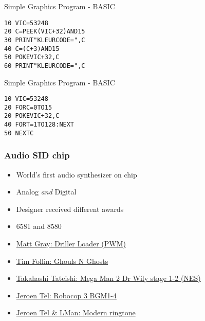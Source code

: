 \documentclass{beamer}
\begin{document}

\begin{frame}[fragile]{Simple Graphics Program - BASIC}

\begin{lstlisting}
10 VIC=53248
20 C=PEEK(VIC+32)AND15
30 PRINT"KLEURCODE=",C
40 C=(C+3)AND15
50 POKEVIC+32,C
60 PRINT"KLEURCODE=",C
\end{lstlisting}

\end{frame}


\begin{frame}[fragile]{Simple Graphics Program - BASIC}

\begin{lstlisting}
10 VIC=53248
20 FORC=0TO15
20 POKEVIC+32,C
40 FORT=1TO128:NEXT
50 NEXTC
\end{lstlisting}

\end{frame}



\begin{frame}
\frametitle{Audio SID chip}

\begin{itemize}
\item World's first audio synthesizer on chip
\item Analog \emph{and} Digital
\item Designer received different awards
\item 6581 and 8580
\item \href{https://www.youtube.com/watch?v=1UzJUCPkCjo}{Matt Gray: Driller Loader (PWM)}
\item \href{https://www.youtube.com/watch?v=wz36JWHTk-A}{Tim Follin: Ghouls N Ghosts}
\item \href{https://www.youtube.com/watch?v=HdoHpxZJxAI}{Takahashi Tateishi: Mega Man 2 Dr Wily stage 1-2 (NES)}
\item \href{https://www.youtube.com/watch?v=JdmpyXrgnUg}{Jeroen Tel: Robocop 3 BGM1-4}
\item \href{https://www.youtube.com/watch?v=pnIiui46ggY}{Jeroen Tel \& LMan: Modern ringtone}

\end{itemize}

\end{frame}
\end{document}
